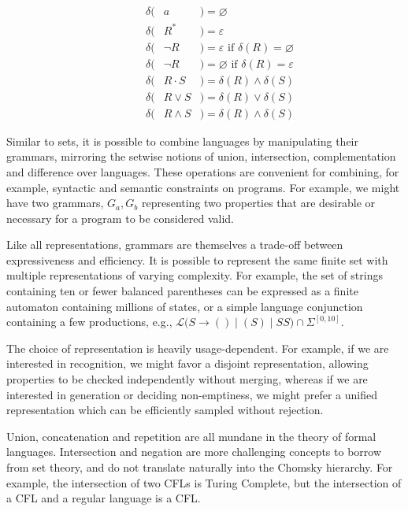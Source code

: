 \begin{multicols}{2}
\begin{eqnarray*}
    \phantom{---}\delta(& a           &)= \varnothing                                      \\
    \phantom{---}\delta(& R^*         &)= \varepsilon                                      \\
    \phantom{---}\delta(& \neg R      &)= \varepsilon \text{ if } \delta(R) = \varnothing  \\
    \phantom{---}\delta(& \neg R      &)= \varnothing \text{ if } \delta(R) = \varepsilon  \\
    \phantom{---}\delta(& R\cdot S    &)= \delta(R) \land \delta(S)                        \\
    \phantom{---}\delta(& R\vee S     &)= \delta(R) \vee  \delta(S)                        \\
    \phantom{---}\delta(& R\land S    &)= \delta(R) \land \delta(S)
  \end{eqnarray*}
\end{multicols}

Similar to sets, it is possible to combine languages by manipulating their grammars, mirroring the setwise notions of union, intersection, complementation and difference over languages. These operations are convenient for combining, for example, syntactic and semantic constraints on programs. For example, we might have two grammars, $G_a, G_b$ representing two properties that are desirable or necessary for a program to be considered valid. %

Like all representations, grammars are themselves a trade-off between expressiveness and efficiency. It is possible to represent the same finite set with multiple representations of varying complexity. For example, the set of strings containing ten or fewer balanced parentheses can be expressed as a finite automaton containing millions of states, or a simple language conjunction containing a few productions, e.g., $\mathcal{L}\Big(S \rightarrow ( ) \mid (S) \mid S S \Big) \cap \Sigma^{[0,10]}$.

The choice of representation is heavily usage-dependent. For example, if we are interested in recognition, we might favor a disjoint representation, allowing properties to be checked independently without merging, whereas if we are interested in generation or deciding non-emptiness, we might prefer a unified representation which can be efficiently sampled without rejection.

Union, concatenation and repetition are all mundane in the theory of formal languages. Intersection and negation are more challenging concepts to borrow from set theory, and do not translate naturally into the Chomsky hierarchy. For example, the intersection of two CFLs is Turing Complete, but the intersection of a CFL and a regular language is a CFL.

